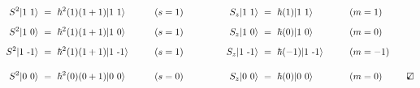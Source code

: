\documentclass[12pt]{article}
\newcommand{\checkedbox}{\mbox{\ooalign{$\checkmark$\cr\hidewidth$\square$\hidewidth\cr}}} %
\begin{document}
\vspace{20pt} \noindent
\( \begin{aligned}[b]
    S^2 | 1 \ 1 \rangle \ &= \ 
        \hbar^2(1)(1+1) | 1 \ 1 \rangle& \hspace{18pt} (s&=1) 
    & \hspace{18pt}\hspace{18pt} 
    S_z | 1 \ 1 \rangle \ &= \ 
        \hbar(1) | 1 \ 1 \rangle& \hspace{18pt} (m&=1)
    \\[5pt]
    S^2 | 1 \ 0 \rangle \ &= \ 
        \hbar^2(1)(1+1) | 1 \ 0 \rangle& \hspace{18pt} (s&=1)
    & \hspace{18pt}\hspace{18pt}
    S_z | 1 \ 0 \rangle \ &= \ 
        \hbar(0) | 1 \ 0 \rangle& \hspace{18pt} (m&=0)
    \\[5pt]
    S^2 | 1 \ \text{-} 1 \rangle \ &= \ 
        \hbar^2(1)(1+1) | 1 \ \text{-} 1 \rangle& \hspace{18pt} (s&=1)
    & \hspace{18pt}\hspace{18pt}
    S_z | 1 \ \text{-} 1 \rangle \ &= \ 
        \hbar(-1) | 1 \ \text{-} 1 \rangle& \hspace{18pt} (m&=-1)
    \\[10pt]
    S^2 | 0 \ 0 \rangle \ &= \ 
        \hbar^2(0)(0+1) | 0 \ 0 \rangle& \hspace{18pt} (s&=0) 
    & \hspace{18pt}\hspace{18pt}
    S_z | 0 \ 0 \rangle \ &= \ 
        \hbar(0) | 0 \ 0 \rangle& \hspace{18pt} (m&=0)
\end{aligned} \hspace{18pt} \checkedbox \)
\end{document}
